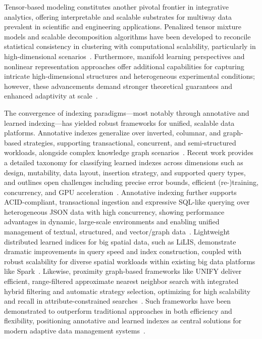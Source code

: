 \documentclass[sigconf]{acmart}
\begin{document}
Tensor-based modeling constitutes another pivotal frontier in integrative analytics, offering interpretable and scalable substrates for multiway data prevalent in scientific and engineering applications. Penalized tensor mixture models and scalable decomposition algorithms have been developed to reconcile statistical consistency in clustering with computational scalability, particularly in high-dimensional scenarios~\cite{ref36, ref71, ref73}. Furthermore, manifold learning perspectives and nonlinear representation approaches offer additional capabilities for capturing intricate high-dimensional structures and heterogeneous experimental conditions; however, these advancements demand stronger theoretical guarantees and enhanced adaptivity at scale~\cite{ref76, ref74, ref79}.

The convergence of indexing paradigms---most notably through annotative and learned indexing---has yielded robust frameworks for unified, scalable data platforms. Annotative indexes generalize over inverted, columnar, and graph-based strategies, supporting transactional, concurrent, and semi-structured workloads, alongside complex knowledge graph scenarios~\cite{ref110, ref111, ref112}. Recent work provides a detailed taxonomy for classifying learned indexes across dimensions such as design, mutability, data layout, insertion strategy, and supported query types, and outlines open challenges including precise error bounds, efficient (re-)training, concurrency, and GPU acceleration~\cite{ref110}. Annotative indexing further supports ACID-compliant, transactional ingestion and expressive SQL-like querying over heterogeneous JSON data with high concurrency, showing performance advantages in dynamic, large-scale environments and enabling unified management of textual, structured, and vector/graph data~\cite{ref112}. Lightweight distributed learned indices for big spatial data, such as LiLIS, demonstrate dramatic improvements in query speed and index construction, coupled with robust scalability for diverse spatial workloads within existing big data platforms like Spark~\cite{ref111}. Likewise, proximity graph-based frameworks like UNIFY deliver efficient, range-filtered approximate nearest neighbor search with integrated hybrid filtering and automatic strategy selection, optimizing for high scalability and recall in attribute-constrained searches~\cite{ref12}. Such frameworks have been demonstrated to outperform traditional approaches in both efficiency and flexibility, positioning annotative and learned indexes as central solutions for modern adaptive data management systems~\cite{ref110, ref111, ref112, ref113, ref114}.
\end{document}
